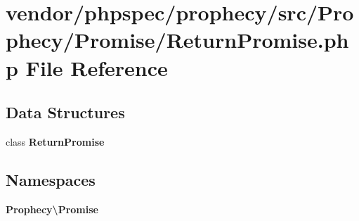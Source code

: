 \section{vendor/phpspec/prophecy/src/\+Prophecy/\+Promise/\+Return\+Promise.php File Reference}
\label{_return_promise_8php}
\subsection*{Data Structures}
\begin{DoxyCompactItemize}
\item 
class {\bf Return\+Promise}
\end{DoxyCompactItemize}
\subsection*{Namespaces}
\begin{DoxyCompactItemize}
\item 
 {\bf Prophecy\textbackslash{}\+Promise}
\end{DoxyCompactItemize}
